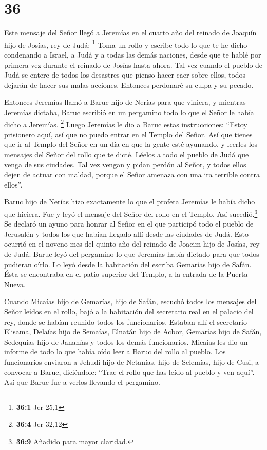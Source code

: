 \hypertarget{section-35}{%
\section{36}\label{section-35}}

 Este mensaje del Señor llegó a Jeremías en el cuarto año
del reinado de Joaquín hijo de Josías, rey de Judá: \footnote{\textbf{36:1}
  Jer 25,1}  Toma un rollo y escribe todo lo que te he
dicho condenando a Israel, a Judá y a todas las demás naciones, desde
que te hablé por primera vez durante el reinado de Josías hasta ahora.
 Tal vez cuando el pueblo de Judá se entere de todos los
desastres que pienso hacer caer sobre ellos, todos dejarán de hacer sus
malas acciones. Entonces perdonaré su culpa y su pecado.

 Entonces Jeremías llamó a Baruc hijo de Nerías para que
viniera, y mientras Jeremías dictaba, Baruc escribió en un pergamino
todo lo que el Señor le había dicho a Jeremías. \footnote{\textbf{36:4}
  Jer 32,12}  Luego Jeremías le dio a Baruc estas
instrucciones: ``Estoy prisionero aquí, así que no puedo entrar en el
Templo del Señor.  Así que tienes que ir al Templo del
Señor en un día en que la gente esté ayunando, y leerles los mensajes
del Señor del rollo que te dicté. Léelos a todo el pueblo de Judá que
venga de sus ciudades.  Tal vez vengan y pidan perdón al
Señor, y todos ellos dejen de actuar con maldad, porque el Señor amenaza
con una ira terrible contra ellos''.

 Baruc hijo de Nerías hizo exactamente lo que el profeta
Jeremías le había dicho que hiciera. Fue y leyó el mensaje del Señor del
rollo en el Templo.  Así sucedió.\footnote{\textbf{36:9}
  Añadido para mayor claridad.} Se declaró un ayuno para honrar al Señor
en el que participó todo el pueblo de Jerusalén y todos los que habían
llegado allí desde las ciudades de Judá. Esto ocurrió en el noveno mes
del quinto año del reinado de Joacim hijo de Josías, rey de Judá.
 Baruc leyó del pergamino lo que Jeremías había dictado
para que todos pudieran oírlo. Lo leyó desde la habitación del escriba
Gemarías hijo de Safán. Ésta se encontraba en el patio superior del
Templo, a la entrada de la Puerta Nueva.

 Cuando Micaías hijo de Gemarías, hijo de Safán, escuchó
todos los mensajes del Señor leídos en el rollo,  bajó a
la habitación del secretario real en el palacio del rey, donde se habían
reunido todos los funcionarios. Estaban allí el secretario Elisama,
Delaías hijo de Semaías, Elnatán hijo de Acbor, Gemarías hijo de Safán,
Sedequías hijo de Jananías y todos los demás funcionarios.
 Micaías les dio un informe de todo lo que había oído
leer a Baruc del rollo al pueblo.  Los funcionarios
enviaron a Jehudí hijo de Netanías, hijo de Selemías, hijo de Cusi, a
convocar a Baruc, diciéndole: ``Trae el rollo que has leído al pueblo y
ven aquí''. Así que Baruc fue a verlos llevando el pergamino.

